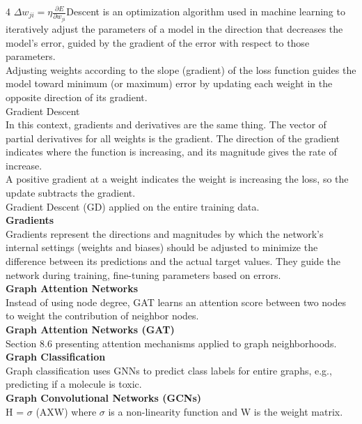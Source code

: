 \documentclass[8pt]{extarticle}
\begin{document}
\begin{multicols}{4}
$ \Delta w_{ji} = \eta \frac{\partial E}{\partial w_{ji}} $\Gradient Descent is an optimization algorithm used in machine learning to iteratively adjust the parameters of a model in the direction that decreases the model's error, guided by the gradient of the error with respect to those parameters.\\
Adjusting weights according to the slope (gradient) of the loss function guides the model toward minimum (or maximum) error by updating each weight in the opposite direction of its gradient.\\
Gradient Descent\\
In this context, gradients and derivatives are the same thing. The vector of partial derivatives for all weights is the gradient. The direction of the gradient indicates where the function is increasing, and its magnitude gives the rate of increase.\\
A positive gradient at a weight indicates the weight is increasing the loss, so the update subtracts the gradient.\\
Gradient Descent (GD) applied on the entire training data.\\
\vspace{2pt}\textbf{Gradients}\\
Gradients represent the directions and magnitudes by which the network's internal settings (weights and biases) should be adjusted to minimize the difference between its predictions and the actual target values. They guide the network during training, fine-tuning parameters based on errors.\\
\vspace{2pt}\textbf{Graph Attention Networks}\\
Instead of using node degree, GAT learns an attention score between two nodes to weight the contribution of neighbor nodes.\\
\vspace{2pt}\textbf{Graph Attention Networks (GAT)}\\
Section 8.6 presenting attention mechanisms applied to graph neighborhoods.\\
\vspace{2pt}\textbf{Graph Classification}\\
Graph classification uses GNNs to predict class labels for entire graphs, e.g., predicting if a molecule is toxic.\\
\vspace{2pt}\textbf{Graph Convolutional Networks (GCNs)}\\
H = $\sigma$ (AXW) where $\sigma$ is a non-linearity function and W is the weight matrix.\\

\end{multicols}
\end{document}
